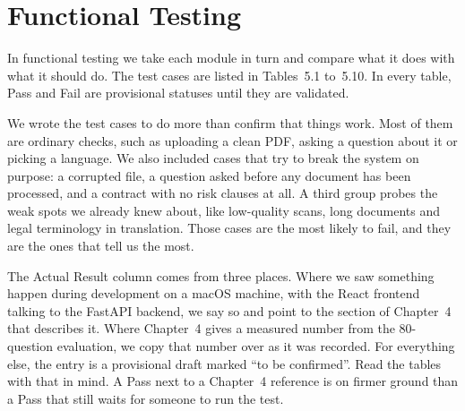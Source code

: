 \documentclass[12pt,a4paper,oneside]{report}
\begin{document}
\section{Functional Testing}
In functional testing we take each module in turn and compare what it does with what it should do. The test cases are listed in Tables~5.1 to~5.10. In every table, Pass and Fail are provisional statuses until they are validated.

We wrote the test cases to do more than confirm that things work. Most of them are ordinary checks, such as uploading a clean PDF, asking a question about it or picking a language. We also included cases that try to break the system on purpose: a corrupted file, a question asked before any document has been processed, and a contract with no risk clauses at all. A third group probes the weak spots we already knew about, like low-quality scans, long documents and legal terminology in translation. Those cases are the most likely to fail, and they are the ones that tell us the most.

The Actual Result column comes from three places. Where we saw something happen during development on a macOS machine, with the React frontend talking to the FastAPI backend, we say so and point to the section of Chapter~4 that describes it. Where Chapter~4 gives a measured number from the 80-question evaluation, we copy that number over as it was recorded. For everything else, the entry is a provisional draft marked ``to be confirmed''. Read the tables with that in mind. A Pass next to a Chapter~4 reference is on firmer ground than a Pass that still waits for someone to run the test.

\end{document}
